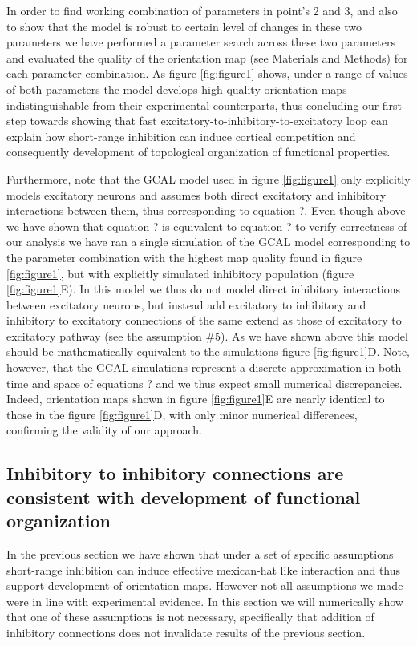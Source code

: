 \documentclass[a4paper,10pt]{article}
\begin{document}
In order to find working combination of parameters in point's 2 and 3, and also to show that the model is robust to certain level of changes
in these two parameters we have performed a parameter search across these two parameters and evaluated the quality of the orientation map (see Materials and Methods) for each 
parameter combination. As figure \ref{fig:figure1} shows, under a range of values of both parameters the model develops high-quality orientation maps indistinguishable
from their experimental counterparts, thus concluding our first step towards showing that fast excitatory-to-inhibitory-to-excitatory loop can explain 
how short-range inhibition can induce cortical competition and consequently development of topological organization of functional properties.

Furthermore, note that the GCAL model used in figure \ref{fig:figure1} only explicitly models excitatory neurons and assumes both direct excitatory and inhibitory
interactions between them, thus corresponding to equation ?. Even though above we have shown that equation ? is equivalent to equation ? to verify 
correctness of our analysis we have ran a single simulation of the GCAL model corresponding to the parameter combination with the highest map 
quality found in figure \ref{fig:figure1}, but with explicitly simulated inhibitory population (figure \ref{fig:figure1}E). In this model we thus do not model direct inhibitory interactions between excitatory neurons, but instead add excitatory to inhibitory and inhibitory to excitatory connections of the same extend as those of excitatory to excitatory pathway (see the assumption \#5). As we have shown above this model should be mathematically equivalent to the simulations figure \ref{fig:figure1}D. Note, however, that the GCAL simulations represent a discrete approximation in both time and space of equations ? and we thus expect small numerical discrepancies. Indeed, orientation maps shown in figure \ref{fig:figure1}E  are nearly identical to those in the figure \ref{fig:figure1}D, with only minor numerical differences, confirming the validity of our approach.


\subsection{Inhibitory to inhibitory connections are consistent with development of functional organization} \label{sec:SM2}

In the previous section we have shown that under a set of specific assumptions short-range inhibition can induce 
effective mexican-hat like interaction and thus support development of orientation maps. However not all assumptions we 
made were in line with experimental evidence. In this section we will numerically show that one of these assumptions is not necessary, 
specifically that addition of inhibitory connections does not invalidate results of the previous section. 
\end{document}
